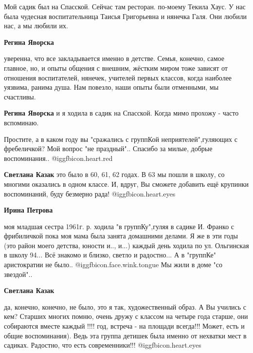 \begin{itemize}
\begin{itemize}
\end{itemize} %


Мой садик был на Спасской. Сейчас там ресторан. по-моему Текила Хаус. У нас
была чудесная воспитательница Таисья Григорьевна и нянечка Галя. Они любили
нас, а мы любили их.

\begin{itemize} %
\textbf{Регина Яворска} 

уверенна, что все закладывается именно в детстве. Семья, конечно, самое
главное, но, и опыты общения с внешним, жёстким миром тоже зависят от отношения
воспитателей, нянечек, учителей первых классов, когда наиболее уязвима, ранима
душа. Нам повезло, наши опыты были отменными, мы счастливы.


\textbf{Регина Яворска} и я ходила в садик на Спасской. Когда мимо прохожу - часто вспоминаю.
\end{itemize} %


Простите, а в каком году вы "сражались с группКой неприятелей",гуляющих с
фребеличкой? Мой вопрос "не праздный".. Спасибо за милые, добрые воспоминания.. @igg{fbicon.heart.red}

\begin{itemize} %
\textbf{Светлана Казак} это было в 60, 61, 62 годах. В 63 мы пошли в школу, со многими оказались в одном классе. И, вдруг, Вы сможете добавить ещё крупинки воспоминаний, буду безмерно рада!  @igg{fbicon.heart.eyes} 

\begin{itemize} %
\textbf{Ирина Петрова} 

моя младшая сестра 1961г. р. ходила "в группКу",гуляя в садике И. Франко с
фрибиличкой пока моя мама была занята домашними делами. Я же в эти годы (это
район моего детства, юности и.., и...) каждый день ходила по ул. Ольгинская в
школу 94... Всё знакомо и близко, светло и радостно... А в "группКе" аристократии
не было.. @igg{fbicon.face.wink.tongue}  Мы жили в доме "со звездой"..

\end{itemize} %

\textbf{Светлана Казак} 

да, конечно, конечно, не было, это я так, художественный образ. А Вы учились с
кем? Старших многих помню, очень дружу с классом на четыре года старше, они
собираются вместе каждый !!!! год, встреча - на площади всегда!!! Может, есть и
общие воспоминания). Ведь эта группа детишек была именно от нехватки мест в
садиках. Радостно, что есть современники!!! @igg{fbicon.heart.eyes} 


\end{itemize}
\end{itemize}

